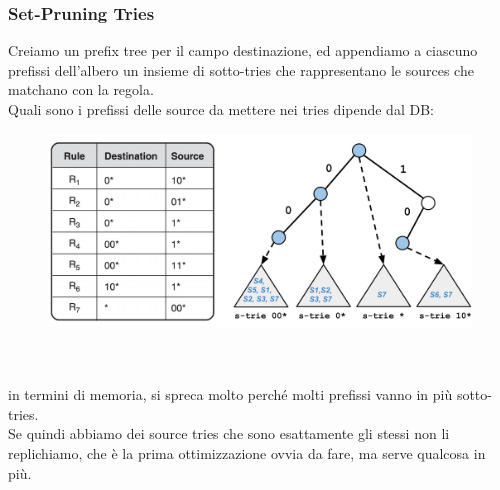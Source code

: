 \documentclass[12pt, oneside]{extbook} %
\begin{document}
\subsubsection{Set-Pruning Tries}
Creiamo un prefix tree per il campo destinazione, ed appendiamo a ciascuno prefissi dell'albero un insieme di sotto-tries che rappresentano le sources che matchano con la regola.
\\Quali sono i prefissi delle source da mettere nei tries dipende dal DB:\\
\begin{figure}[h!]
    \centering
    \includegraphics[scale=0.5]{../../immagini/sp_tries}
\end{figure}\\\\
in termini di memoria, si spreca molto perché molti prefissi vanno in più sotto-tries.
\\Se quindi abbiamo dei source tries che sono esattamente gli stessi non li replichiamo, che è la prima ottimizzazione ovvia da fare, ma serve qualcosa in più.
\end{document}
